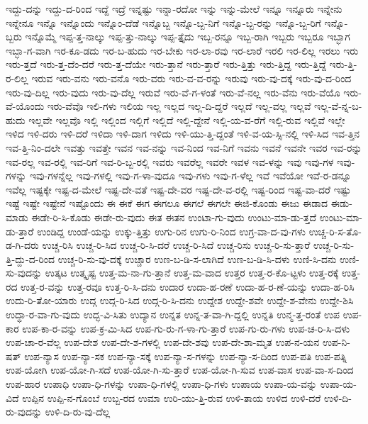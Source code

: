 {ಇದ್ದು-ದನ್ನು
ಇದ್ದು-ದ-ರಿಂದ
ಇದ್ದೆ
ಇದ್ರೆ
ಇನ್ನಷ್ಟು
ಇನ್ನಾ-ರದೋ
ಇನ್ನು
ಇನ್ನು-ಮೇಲೆ
ಇನ್ನೂ
ಇನ್ನೂರು
ಇನ್ನೇನು
ಇನ್ನೇನೂ
ಇನ್ನೊ
ಇನ್ನೊಂದು
ಇನ್ನೊಂ-ದೆಡೆ
ಇನ್ನೊಬ್ಬ
ಇನ್ನೊ-ಬ್ಬ-ನಿಗೆ
ಇನ್ನೊ-ಬ್ಬ-ರನ್ನು
ಇನ್ನೊ-ಬ್ಬ-ರಿಗೆ
ಇನ್ನೊ-ಬ್ಬರು
ಇನ್ನೊಮ್ಮೆ
ಇಪ್ಪ-ತ್ತ-ನಾಲ್ಕು
ಇಪ್ಪ-ತ್ತು-ನಾಲ್ಕು
ಇಪ್ಪ-ತ್ತೈದು
ಇಬ್ಬ-ರನ್ನೂ
ಇಬ್ಬ-ರಾಗಿ
ಇಬ್ಬರು
ಇಬ್ಬರೂ
ಇಬ್ಭಾಗ
ಇಬ್ಭಾ-ಗ-ವಾಗಿ
ಇರ-ಕೂ-ಡದು
ಇರ-ಬ-ಹುದು
ಇರ-ಬೇಕು
ಇರ-ಲಾ-ರವು
ಇರ-ಲಾರೆ
ಇರಲಿ
ಇರ-ಲಿಲ್ಲ
ಇರಲು
ಇರು
ಇರು-ತ್ತದೆ
ಇರು-ತ್ತ-ದೆಂ-ದರೆ
ಇರು-ತ್ತ-ದೆಯೇ
ಇರು-ತ್ತಾನೆ
ಇರು-ತ್ತಾರೆ
ಇರು-ತ್ತಿತ್ತು
ಇರು-ತ್ತಿದ್ದ
ಇರು-ತ್ತಿದ್ದೆ
ಇರು-ತ್ತಿ-ರ-ಲಿಲ್ಲ
ಇರುವ
ಇರು-ವನು
ಇರು-ವನೊ
ಇರು-ವರು
ಇರು-ವ-ವ-ರನ್ನು
ಇರುವು
ಇರು-ವು-ದಕ್ಕೆ
ಇರು-ವು-ದ-ರಿಂದ
ಇರು-ವು-ದಿಲ್ಲ
ಇರು-ವುದು
ಇರು-ವು-ದೆಲ್ಲ
ಇರುವೆ
ಇರು-ವೆ-ಗ-ಳಂತೆ
ಇರು-ವೆ-ನಲ್ಲ
ಇರು-ವೆನು
ಇರು-ವೆಯೊ
ಇರು-ವೆ-ಯೊಂದು
ಇರು-ವೆವೊ
ಇಲಿ-ಗಳು
ಇಲಿಯ
ಇಲ್ಲ
ಇಲ್ಲದ
ಇಲ್ಲ-ದಿ-ದ್ದರೆ
ಇಲ್ಲದೆ
ಇಲ್ಲ-ವಲ್ಲ
ಇಲ್ಲವೆ
ಇಲ್ಲ-ವೆ-ನ್ನ-ಬ-ಹುದು
ಇಲ್ಲವೇ
ಇಲ್ಲವೊ
ಇಲ್ಲಿ
ಇಲ್ಲಿಂದ
ಇಲ್ಲಿಗೆ
ಇಲ್ಲಿದೆ
ಇಲ್ಲಿ-ದ್ದೇನೆ
ಇಲ್ಲಿ-ಯ-ವ-ರೆಗೆ
ಇಲ್ಲಿ-ರುವ
ಇಲ್ಲಿವೆ
ಇಲ್ಲೇ
ಇಳಿದ
ಇಳಿ-ದರು
ಇಳಿ-ದರೆ
ಇಳಿದಾ
ಇಳಿ-ದಾಗ
ಇಳಿದು
ಇಳಿ-ಯು-ತ್ತಿ-ದ್ದಂತೆ
ಇಳಿ-ವ-ಯ-ಸ್ಸಿ-ನಲ್ಲಿ
ಇಳಿ-ಸಿದ
ಇವ-ತ್ತಿನ
ಇವ-ತ್ತಿ-ನಿಂ-ದಲೇ
ಇವತ್ತು
ಇವತ್ತೇ
ಇವನ
ಇವ-ನನ್ನು
ಇವ-ನಿಂದ
ಇವ-ನಿಗೆ
ಇವನು
ಇವನೆ
ಇವನೇ
ಇವರ
ಇವ-ರನ್ನು
ಇವ-ರಲ್ಲ
ಇವ-ರಲ್ಲಿ
ಇವ-ರಿಗೆ
ಇವ-ರಿ-ಬ್ಬ-ರಲ್ಲಿ
ಇವರು
ಇವರೆಲ್ಲ
ಇವರೇ
ಇವಳ
ಇವ-ಳನ್ನು
ಇವು
ಇವು-ಗಳ
ಇವು-ಗಳನ್ನು
ಇವು-ಗಳನ್ನೆಲ್ಲ
ಇವು-ಗಳಲ್ಲಿ
ಇವು-ಗ-ಳಾ-ವುದೂ
ಇವು-ಗಳು
ಇವು-ಗ-ಳೆಲ್ಲ
ಇವೆ
ಇವೆಯೋ
ಇವೆ-ರ-ಡನ್ನೂ
ಇವೆಲ್ಲ
ಇಷ್ಟಕ್ಕೇ
ಇಷ್ಟ-ದ-ಮೇಲೆ
ಇಷ್ಟ-ದೇ-ವತೆ
ಇಷ್ಟ-ದೇ-ವರ
ಇಷ್ಟ-ದೇ-ವ-ರಲ್ಲಿ
ಇಷ್ಟ-ರಿಂದ
ಇಷ್ಟ-ವಾ-ದರೆ
ಇಷ್ಟು
ಇಷ್ಟೆ
ಇಷ್ಟೇ
ಇಷ್ಟೇನೆ
ಇಷ್ಟೊಂದು
ಈ
ಈಕೆ
ಈಗ
ಈಗಲೂ
ಈಗಲೆ
ಈಗಲೇ
ಈಜಿ-ಕೊಂಡು
ಈಜು
ಈಡಾದ
ಈಡು-ಮಾಡು
ಈಡೇ-ರಿ-ಸಿ-ಕೊಡು
ಈಡೇ-ರು-ವುದು
ಈತ
ಈತನ
ಉಂಟಾ-ಗು-ವುದು
ಉಂಟು-ಮಾ-ಡು-ತ್ತದೆ
ಉಂಟು-ಮಾ-ಡು-ತ್ತಾರೆ
ಉಂಡಿದ್ದ
ಉಂಡೆ-ಯನ್ನು
ಉಕ್ಕು-ತ್ತಿತ್ತು
ಉಗು-ರಿನ
ಉಗು-ರಿ-ನಿಂದ
ಉಗ್ರ-ವಾ-ದ-ವು-ಗಳು
ಉಚ್ಚ-ರಿ-ಸ-ತೊ-ಡ-ಗಿ-ದರು
ಉಚ್ಚ-ರಿಸಿ
ಉಚ್ಚ-ರಿ-ಸಿದ
ಉಚ್ಚ-ರಿ-ಸಿ-ದರೆ
ಉಚ್ಚ-ರಿ-ಸಿದೆ
ಉಚ್ಚ-ರಿಸು
ಉಚ್ಚ-ರಿ-ಸು-ತ್ತಾರೆ
ಉಚ್ಚ-ರಿ-ಸು-ತ್ತಿ-ದ್ದು-ದ-ರಿಂದ
ಉಚ್ಚ-ರಿ-ಸು-ವು-ದಕ್ಕೆ
ಉಚ್ಚಾರ
ಉಣ-ಬ-ಡಿ-ಸ-ಲಾಗಿದೆ
ಉಣ-ಬ-ಡಿ-ಸಿ-ದಳು
ಉಣಿ-ಸಿ-ದನು
ಉಣಿ-ಸು-ವುದನ್ನು
ಉತ್ಕಟ
ಉತ್ಕೃಷ್ಟ
ಉತ್ತ-ಮ-ನಾ-ಗು-ತ್ತಾನೆ
ಉತ್ತ-ಮ-ವಾದ
ಉತ್ತರ
ಉತ್ತ-ರ-ಕೊ-ಟ್ಟಳು
ಉತ್ತ-ರಕ್ಕೆ
ಉತ್ತ-ರದ
ಉತ್ತ-ರ-ವನ್ನು
ಉತ್ತ-ರವೂ
ಉತ್ತ-ರಿ-ಸಿ-ದನು
ಉದಾರ
ಉದಾ-ಹ-ರಣೆ
ಉದಾ-ಹ-ರ-ಣೆ-ಯನ್ನು
ಉದಾ-ಹ-ರಿಸಿ
ಉದು-ರಿ-ತೋ-ಯಾರು
ಉದ್ಗ
ಉದ್ಗ-ರಿ-ಸಿದ
ಉದ್ಗ-ರಿ-ಸಿ-ದನು
ಉದ್ದೇಶ
ಉದ್ದೇ-ಶವೇ
ಉದ್ದೇ-ಶ-ವೇನು
ಉದ್ದೇ-ಶಿಸಿ
ಉದ್ಧಾ-ರ-ವಾ-ಗು-ವುದು
ಉದ್ಭ-ವಿ-ಸಿತು
ಉದ್ಯಾನ
ಉನ್ನತ
ಉನ್ನ-ತ-ವಾ-ಗಿ-ದ್ದಲ್ಲಿ
ಉನ್ನತಿ
ಉನ್ಮ-ತ್ತ-ರಂತೆ
ಉಪ
ಉಪ-ಕಾರ
ಉಪ-ಕಾ-ರ-ವನ್ನು
ಉಪ-ಕ್ರ-ಮಿ-ಸಿದ
ಉಪ-ಗು-ರು-ಗ-ಳಾ-ಗು-ತ್ತಾರೆ
ಉಪ-ಗು-ರು-ಗಳು
ಉಪ-ಚ-ರಿ-ಸಿ-ದಳು
ಉಪ-ಚಾ-ರ-ವೆಲ್ಲ
ಉಪ-ದೇಶ
ಉಪ-ದೇ-ಶ-ಗಳಲ್ಲಿ
ಉಪ-ದೇ-ಶವು
ಉಪ-ದೇ-ಶಾ-ಮೃತ
ಉಪ-ನ-ಯನ
ಉಪ-ನಿ-ಷತ್
ಉಪ-ನ್ಯಾಸ
ಉಪ-ನ್ಯಾ-ಸಕ
ಉಪ-ನ್ಯಾ-ಸಕ್ಕೆ
ಉಪ-ನ್ಯಾ-ಸ-ಗಳನ್ನು
ಉಪ-ನ್ಯಾ-ಸ-ದಿಂದ
ಉಪ-ಪತಿ
ಉಪ-ಪತ್ನಿ
ಉಪ-ಯೋಗಿ
ಉಪ-ಯೋ-ಗಿ-ಸದೆ
ಉಪ-ಯೋ-ಗಿ-ಸು-ತ್ತಾರೆ
ಉಪ-ಯೋ-ಗಿ-ಸುವ
ಉಪ-ವಾಸ
ಉಪ-ವಾ-ಸ-ದಿಂದ
ಉಪ-ಹಾರ
ಉಪಾಧಿ
ಉಪಾ-ಧಿ-ಗಳನ್ನು
ಉಪಾ-ಧಿ-ಗಳಲ್ಲಿ
ಉಪಾ-ಧಿ-ಗಳು
ಉಪಾಯ
ಉಪಾ-ಯ-ವನ್ನು
ಉಪಾ-ಯ-ವಿದೆ
ಉಪ್ಪಿನ
ಉಪ್ಪಿ-ನ-ಗೊಂಬೆ
ಉಬ್ಬ-ರದ
ಉಮಾ
ಉರಿ-ಯು-ತ್ತಿ-ರುವ
ಉಳಿ-ತಾಯ
ಉಳಿದ
ಉಳಿ-ದರೆ
ಉಳಿ-ದಿ-ರು-ವುದನ್ನು
ಉಳಿ-ದಿ-ರು-ವು-ದೆಲ್ಲ
}
